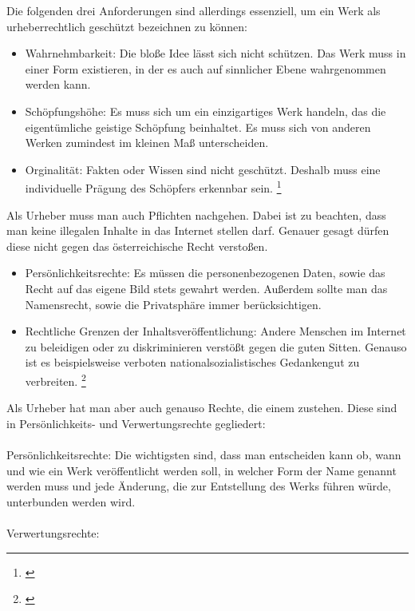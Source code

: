 \documentclass[titlepage,12pt,twoside]{article}
\begin{document}
\hfill \break
Die folgenden drei Anforderungen sind allerdings essenziell, um ein Werk als urheberrechtlich geschützt 
bezeichnen zu können: \\
\begin{itemize}
	\item Wahrnehmbarkeit: Die bloße Idee lässt sich nicht schützen. Das Werk muss in einer Form existieren, 
	in der es auch auf sinnlicher Ebene wahrgenommen werden kann.
	\item Schöpfungshöhe: Es muss sich um ein einzigartiges Werk handeln, das die eigentümliche geistige 
	Schöpfung beinhaltet. Es muss sich von anderen Werken zumindest im kleinen Maß unterscheiden.
	\item Orginalität: Fakten oder Wissen sind nicht geschützt. Deshalb muss eine individuelle Prägung 
	des Schöpfers erkennbar sein. \footnote{\cite{Saferinternet.p8}} \\
\end{itemize}
\hfill \break
Als Urheber muss man auch Pflichten nachgehen. Dabei ist zu beachten, dass man keine illegalen Inhalte in das 
Internet stellen darf. Genauer gesagt dürfen diese nicht gegen das österreichische Recht verstoßen. \\
\begin{itemize}
	\item Persönlichkeitsrechte: Es müssen die personenbezogenen Daten, sowie das Recht auf das eigene Bild 
	stets gewahrt werden. Außerdem sollte man das Namensrecht, sowie die Privatsphäre immer berücksichtigen.
	\item Rechtliche Grenzen der Inhaltsveröffentlichung: Andere Menschen im Internet zu beleidigen oder zu 
	diskriminieren verstößt gegen die guten Sitten. Genauso ist es beispielsweise verboten 
	nationalsozialistisches Gedankengut zu verbreiten. \footnote{\cite{Saferinternet.p10}}
\end{itemize}
\hfill \break
Als Urheber hat man aber auch genauso Rechte, die einem zustehen. Diese sind in Persönlichkeits- und 
Verwertungsrechte gegliedert: \\
\\
Persönlichkeitsrechte: Die wichtigsten sind, dass man entscheiden kann ob, wann und wie ein Werk 
veröffentlicht werden soll, in welcher Form der Name genannt werden muss und jede Änderung, die zur 
Entstellung des Werks führen würde, unterbunden werden wird. \\
\\
Verwertungsrechte: \\ 
\end{document}
